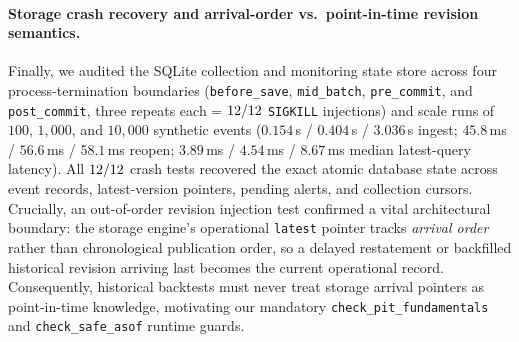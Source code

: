 \paragraph{Storage crash recovery and arrival-order vs.\ point-in-time revision semantics.}
Finally, we audited the SQLite collection and monitoring state store across four process-termination boundaries (\texttt{before\_save}, \texttt{mid\_batch}, \texttt{pre\_commit}, and \texttt{post\_commit}, three repeats each = $12/12$ \texttt{SIGKILL} injections) and scale runs of $100$, $1{,}000$, and $10{,}000$ synthetic events ($0.154$\,s / $0.404$\,s / $3.036$\,s ingest; $45.8$\,ms / $56.6$\,ms / $58.1$\,ms reopen; $3.89$\,ms / $4.54$\,ms / $8.67$\,ms median latest-query latency). All $12/12$ crash tests recovered the exact atomic database state across event records, latest-version pointers, pending alerts, and collection cursors. Crucially, an out-of-order revision injection test confirmed a vital architectural boundary: the storage engine's operational \texttt{latest} pointer tracks \emph{arrival order} rather than chronological publication order, so a delayed restatement or backfilled historical revision arriving last becomes the current operational record. Consequently, historical backtests must never treat storage arrival pointers as point-in-time knowledge, motivating our mandatory \texttt{check\_pit\_fundamentals} and \texttt{check\_safe\_asof} runtime guards.

